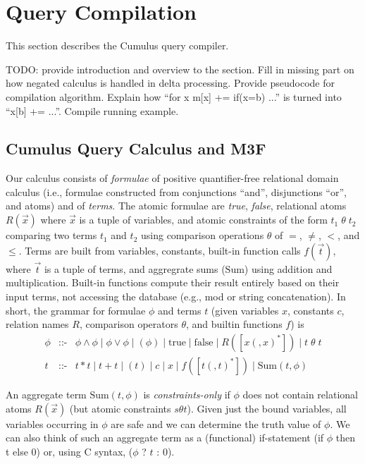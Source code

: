 

\section{Query Compilation}
\label{sec:compiler}


This section describes the Cumulus query compiler.

TODO: provide introduction and overview to the section. Fill in missing part
on how negated calculus is handled in delta processing. Provide
pseudocode for compilation algorithm. Explain how ``for x m[x] += if(x=b) ...''
is turned into ``x[b] += ...''. Compile running example.


\subsection{Cumulus Query Calculus and M3F}


\def\safe{\mbox{safe}}
\def\AggSum{\mbox{Sum}}

Our calculus consists of
{\em formulae} of positive quantifier-free relational domain calculus
(i.e., formulae constructed from conjunctions ``and'',
disjunctions ``or'', and atoms) and of {\em terms}.
%
The atomic formulae are {\em true}, {\em false}, relational atoms $R(\vec{x})$
where $\vec{x}$ is a tuple of variables,
and atomic constraints of the form $t_1 \;\theta\; t_2$ comparing two terms
$t_1$ and $t_2$ using comparison operations $\theta$ of $=$, $\neq$, $<$,
and $\leq$.
%
Terms are built from variables, constants, built-in function calls
$f(\vec{t})$, where $\vec{t}$ is a tuple of terms,
and aggregrate sums ($\AggSum$) using addition and multiplication.
Built-in functions compute their result entirely based on their input
terms, not accessing the database (e.g., mod or string concatenation).
In short, the grammar for formulae $\phi$ and terms $t$
(given variables $x$, constants $c$, relation names $R$,
comparison operators $\theta$,
and builtin functions $f$) is
\begin{eqnarray*}
  \phi &\mbox{::-}& \phi \land \phi
               \mid \phi \lor \phi \mid (\phi)
               \mid \mbox{true} \mid \mbox{false} \mid R([x(,x)^*])
               \mid t \;\theta\; t
\\
  t &\mbox{::-}& t * t \mid t + t \mid (t) \mid c \mid x \mid f([t(,t)^*]) \mid
                 \AggSum(t, \phi)
\end{eqnarray*}

An aggregate term $\AggSum(t, \phi)$
is {\em constraints-only} if $\phi$ does not
contain relational atoms $R(\vec{x})$ (but atomic constraints $s \theta t$).
Given just the bound variables, all variables
occurring in $\phi$ are safe and we can determine the truth value of
$\phi$. We can also think of such an aggregate term as a (functional)
if-statement (if $\phi$ then t else 0)
or, using C syntax, ($\phi$ ? $t$ : 0).

